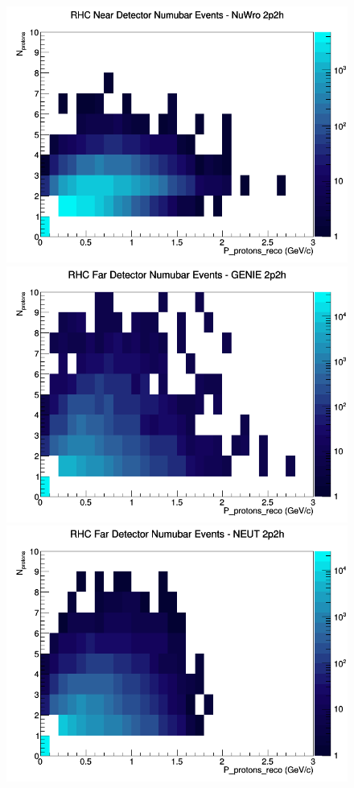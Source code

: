 \begin{figure}[h]
\includegraphics[width=\linewidth]{eff_N_P/LAr/protons/2p2h_RHC_ND_numubar_N_P_NuWro.png}
\endminipage
\newline
{}
\includegraphics[width=\linewidth]{eff_N_P/LAr/protons/2p2h_RHC_FD_numubar_N_P_GENIE.png}
\endminipage
{}
\includegraphics[width=\linewidth]{eff_N_P/LAr/protons/2p2h_RHC_FD_numubar_N_P_NEUT.png}

\end{figure}
